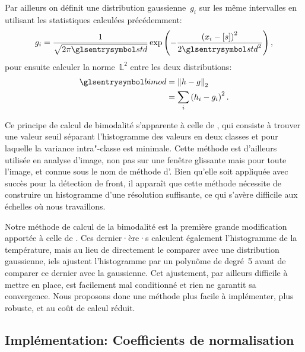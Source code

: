 Par ailleurs on définit une distribution gaussienne~\(g_i\) sur les même intervalles en utilisant les statistiques calculées précédemment:
\begin{equation}
  g_i = \frac{1}{\sqrt{2\pi\am{std}}} \exp\paren{-\frac{\paren{x_i-\moy{s}}^2}{2\am{std}^2}},
\end{equation}
pour ensuite calculer la norme~\(\mathbb{L}^2\) entre les deux distributions:
\begin{equation}
  \begin{split}
  \am{bimod} & = \norme[2]{h - g}\\
             & = \sum_i \paren{h_i - g_i}^2 .
  \end{split}
\end{equation}

Ce principe de calcul de bimodalité s'apparente à celle de \textcite{cayula_1992}, qui consiste à trouver une valeur seuil séparant l'histogramme des valeurs en deux classes et pour laquelle la variance intra"-classe est minimale.
Cette méthode est d'ailleurs utilisée en analyse d'image, non pas sur une fenêtre glissante mais pour toute l'image, et connue sous le nom de méthode d'\textcite{otsu_1979}.
Bien qu'elle soit appliquée avec succès pour la détection de front, il apparaît que cette méthode nécessite de construire un histogramme d'une résolution suffisante, ce qui s'avère difficile aux échelles où nous travaillons.

Notre méthode de calcul de la bimodalité est la première grande modification apportée à celle de \textcite{liu_2016}.
Ces dernier·ère·s calculent également l'histogramme de la température, mais au lieu de directement le comparer avec une distribution gaussienne, iels ajustent l'histogramme par un polynôme de degré~5 avant de comparer ce dernier avec la gaussienne.
Cet ajustement, par ailleurs difficile à mettre en place, est facilement mal conditionné et rien ne garantit sa convergence.
Nous proposons donc une méthode plus facile à implémenter, plus robuste, et au coût de calcul réduit.

\subsection{Implémentation: Coefficients de normalisation}
\label{sec:coef-normalisation}

